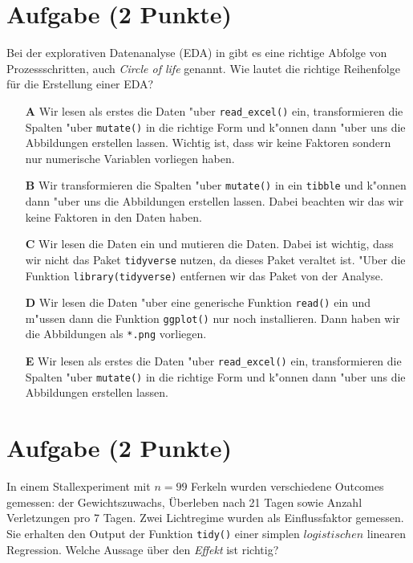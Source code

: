\documentclass[a4paper, 10pt]{scrartcl}\usepackage[]{graphicx}\usepackage[]{xcolor}
\begin{document}
\section{Aufgabe \hfill (2 Punkte)}

Bei der explorativen Datenanalyse (EDA) in \Rlogo gibt es eine richtige Abfolge von Prozessschritten, auch \textit{Circle of life} genannt. Wie lautet die richtige Reihenfolge f{\"u}r die Erstellung einer EDA?



\begin{enumerate}
\item [\textbf{A} \msquare] Wir lesen als erstes die Daten {"u}ber \texttt{read\_excel()} ein, transformieren die Spalten {"u}ber \texttt{mutate()} in die richtige Form und k{"o}nnen dann  {"u}ber  uns die Abbildungen erstellen lassen. Wichtig ist, dass wir keine Faktoren sondern nur numerische Variablen vorliegen haben.
\item [\textbf{B} \msquare] Wir transformieren die Spalten {"u}ber \texttt{mutate()} in ein \texttt{tibble} und k{"o}nnen dann {"u}ber  uns die Abbildungen erstellen lassen. Dabei beachten wir das wir keine Faktoren in den Daten haben.
\item [\textbf{C} \msquare] Wir lesen die Daten ein und mutieren die Daten. Dabei ist wichtig, dass wir nicht das Paket \texttt{tidyverse} nutzen, da dieses Paket veraltet ist. {"U}ber die Funktion \texttt{library(tidyverse)} entfernen wir das Paket von der Analyse.
\item [\textbf{D} \msquare] Wir lesen die Daten {"u}ber eine generische Funktion \texttt{read()} ein und m{"u}ssen dann die Funktion \texttt{ggplot()} nur noch installieren. Dann haben wir die Abbildungen als \texttt{*.png} vorliegen.
\item [\textbf{E} \msquare] Wir lesen als erstes die Daten {"u}ber \texttt{read\_excel()} ein, transformieren die Spalten {"u}ber \texttt{mutate()} in die richtige Form und k{"o}nnen dann {"u}ber  uns die Abbildungen erstellen lassen.
\end{enumerate}

\section{Aufgabe \hfill (2 Punkte)}



In einem Stallexperiment mit $n = 99$ Ferkeln wurden verschiedene
Outcomes gemessen: der Gewichtszuwachs, {\"U}berleben nach 21 Tagen sowie
Anzahl Verletzungen pro 7 Tagen. Zwei Lichtregime wurden als
Einflussfaktor gemessen. Sie erhalten den \Rlogo Output der Funktion
\texttt{tidy()} einer simplen $logistischen$ linearen
Regression. Welche Aussage {\"u}ber den \textit{Effekt} ist richtig?
\end{document}
